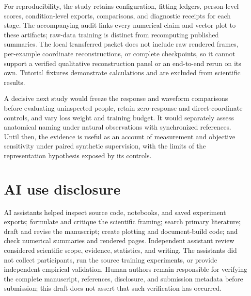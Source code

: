 \documentclass{article}
\begin{document}
For reproducibility, the study retains configuration, fitting ledgers, person-level scores, condition-level exports, comparisons, and diagnostic receipts for each stage. The accompanying audit links every numerical claim and vector plot to these artifacts; raw-data training is distinct from recomputing published summaries. The local transferred packet does not include raw rendered frames, per-example coordinate reconstructions, or complete checkpoints, so it cannot support a verified qualitative reconstruction panel or an end-to-end rerun on its own. Tutorial fixtures demonstrate calculations and are excluded from scientific results.

A decisive next study would freeze the response and waveform comparisons before evaluating uninspected people, retain zero-response and direct-coordinate controls, and vary loss weight and training budget. It would separately assess anatomical naming under natural observations with synchronized references. Until then, the evidence is useful as an account of measurement and objective sensitivity under paired synthetic supervision, with the limits of the representation hypothesis exposed by its controls.

\clearpage
\section*{AI use disclosure}
AI assistants helped inspect source code, notebooks, and saved experiment exports; formulate and critique the scientific framing; search primary literature; draft and revise the manuscript; create plotting and document-build code; and check numerical summaries and rendered pages. Independent assistant review considered scientific scope, evidence, statistics, and writing. The assistants did not collect participants, run the source training experiments, or provide independent empirical validation. Human authors remain responsible for verifying the complete manuscript, references, disclosure, and submission metadata before submission; this draft does not assert that such verification has occurred.


\end{document}
